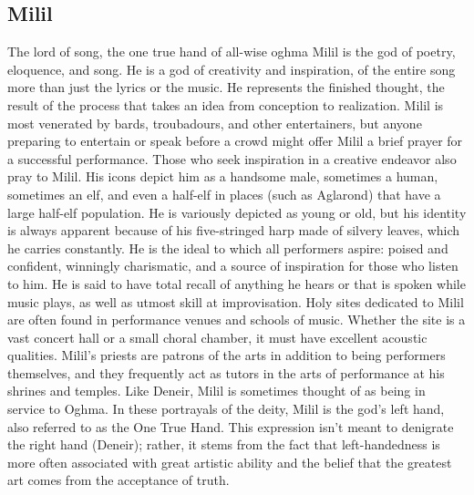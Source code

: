 \documentclass[10pt,a4paper,twoside,twocolumn,openany,bg=print,nodeprecatedcode]{dndbook}
\begin{document}
\subsection{Milil}
The lord of song, the one true hand of all-wise oghma
Milil is the god of poetry, eloquence, and song. He is a god of creativity and inspiration, of the entire song more than just the lyrics or the music. He represents the finished thought, the result of the process that takes an idea from conception to realization. Milil is most venerated by bards, troubadours, and other entertainers, but anyone preparing to entertain or speak before a crowd might offer Milil a brief prayer for a successful performance. Those who seek inspiration in a creative endeavor also pray to Milil.
His icons depict him as a handsome male, sometimes a human, sometimes an elf, and even a half-elf in places (such as Aglarond) that have a large half-elf population. He is variously depicted as young or old, but his identity is always apparent because of his five-stringed harp made of silvery leaves, which he carries constantly. He is the ideal to which all performers aspire: poised and confident, winningly charismatic, and a source of inspiration for those who listen to him. He is said to have total recall of anything he hears or that is spoken while music plays, as well as utmost skill at improvisation.
Holy sites dedicated to Milil are often found in performance venues and schools of music. Whether the site is a vast concert hall or a small choral chamber, it must have excellent acoustic qualities. Milil's priests are patrons of the arts in addition to being performers themselves, and they frequently act as tutors in the arts of performance at his shrines and temples.
Like Deneir, Milil is sometimes thought of as being in service to Oghma. In these portrayals of the deity, Milil is the god's left hand, also referred to as the One True Hand. This expression isn't meant to denigrate the right hand (Deneir); rather, it stems from the fact that left-handedness is more often associated with great artistic ability and the belief that the greatest art comes from the acceptance of truth.
\end{document}
